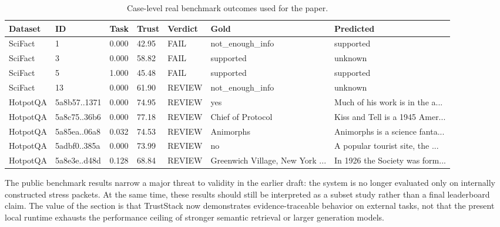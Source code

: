 \begin{table}[t]
\centering
\caption{Case-level real benchmark outcomes used for the paper.}
\label{tab:real-benchmark-cases}
\renewcommand{\arraystretch}{1.05}
\scriptsize
\begin{tabular}{@{}L{0.10\textwidth}L{0.08\textwidth}C{0.08\textwidth}C{0.08\textwidth}C{0.08\textwidth}L{0.18\textwidth}L{0.20\textwidth}@{}}
\hline
{}\textbf{Dataset} & \textbf{ID} & \textbf{Task} & \textbf{Trust} & \textbf{Verdict} & \textbf{Gold} & \textbf{Predicted} \\
\hline
SciFact & 1 & 0.000 & 42.95 & FAIL & not\_enough\_info & supported \\
SciFact & 3 & 0.000 & 58.82 & FAIL & supported & unknown \\
SciFact & 5 & 1.000 & 45.48 & FAIL & supported & supported \\
SciFact & 13 & 0.000 & 61.90 & REVIEW & not\_enough\_info & unknown \\
HotpotQA & 5a8b57..1371 & 0.000 & 74.95 & REVIEW & yes & Much of his work is in the a... \\
HotpotQA & 5a8c75..36b6 & 0.000 & 77.18 & REVIEW & Chief of Protocol & Kiss and Tell is a 1945 Amer... \\
HotpotQA & 5a85ea..06a8 & 0.032 & 74.53 & REVIEW & Animorphs & Animorphs is a science fanta... \\
HotpotQA & 5adbf0..385a & 0.000 & 73.99 & REVIEW & no & A popular tourist site, the ... \\
HotpotQA & 5a8e3e..d48d & 0.128 & 68.84 & REVIEW & Greenwich Village, New York ... & In 1926 the Society was form... \\
\hline
\end{tabular}
\end{table}

The public benchmark results narrow a major threat to validity in the earlier draft: the system is no longer evaluated only on internally constructed stress packets. At the same time, these results should still be interpreted as a subset study rather than a final leaderboard claim. The value of the section is that TrustStack now demonstrates evidence-traceable behavior on external tasks, not that the present local runtime exhausts the performance ceiling of stronger semantic retrieval or larger generation models.
